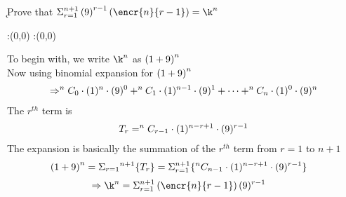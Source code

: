 


\ADD{}\k
\question Prove that $\Sigma_{r=1}^{n+1} \left(\vbone\right)^{r-1} \left(\encr{n}{r-1}\right) = {\k}^{n}$


\watchout

\ifprintanswers
  \begin{marginfigure}
      :(0,0)
      :(0,0)
    \figdrawbegin{}
      \figdrawline [100,101]
    \figdrawend
    \figvisu{\figBoxA}{}{%
    }
    \centerline{\box\figBoxA}
  \end{marginfigure}
\fi 

\begin{solution}
To begin with, we write $\k^{n}$ as $\left( 1 + 9  \right) ^ {n}$ \\
Now using binomial expansion for $\left( 1 + 9  \right) ^ {n}$\\ 
	\begin{align}
\Rightarrow ^{n}{C}_{0} \cdot (1)^{n} \cdot (9)^{0} + ^{n}{C}_{1}\cdot (1)^{n-1} \cdot (9)^{1} + \cdots + ^{n}C_{n}\cdot (1)^{0} \cdot (9)^{n} 
	\end{align}
The $r^{th}$ term is \\
	\begin{align}
{T}_{r} = ^{n}{C}_{r-1} \cdot (1)^{n-r+1} \cdot (9)^{r-1} 
	\end{align} 
The expansion is basically the summation of the $r^{th}$ term from $r=1$ to $n+1$\\
	\begin{align}
\left(1 + 9 \right)^{n}= \Sigma_{r=1}{^{n+1}} \lbrace {T}_{r} \rbrace &= \Sigma _{r=1} ^{n+1} \lbrace ^{n}{C}_{n-1} \cdot (1)^{n-r+1}\cdot (9)^{r-1}\rbrace 
	\end{align}
	\begin{align}
\Rightarrow \k^{n} &= \Sigma_{r=1} ^{n+1} \left( \encr{n}{r-1} \right) (\vbone)^{r-1}
	\end{align}
\end{solution}


